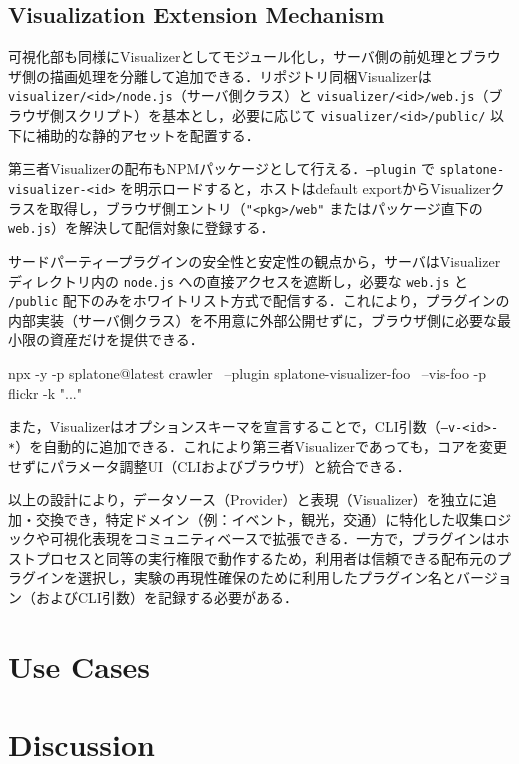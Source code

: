 \documentclass[11pt,a4paper]{jlreq}
\begin{document}
\subsection{Visualization Extension Mechanism}
\label{sec:visualizationextension}
可視化部も同様にVisualizerとしてモジュール化し，サーバ側の前処理とブラウザ側の描画処理を分離して追加できる．リポジトリ同梱Visualizerは \texttt{visualizer/<id>/node.js}（サーバ側クラス）と \texttt{visualizer/<id>/web.js}（ブラウザ側スクリプト）を基本とし，必要に応じて \texttt{visualizer/<id>/public/} 以下に補助的な静的アセットを配置する．

第三者Visualizerの配布もNPMパッケージとして行える．\texttt{--plugin} で \texttt{splatone-visualizer-<id>} を明示ロードすると，ホストはdefault exportからVisualizerクラスを取得し，ブラウザ側エントリ（\texttt{"<pkg>/web"} またはパッケージ直下の \texttt{web.js}）を解決して配信対象に登録する．

サードパーティープラグインの安全性と安定性の観点から，サーバはVisualizerディレクトリ内の \texttt{node.js} への直接アクセスを遮断し，必要な \texttt{web.js} と \texttt{/public} 配下のみをホワイトリスト方式で配信する．これにより，プラグインの内部実装（サーバ側クラス）を不用意に外部公開せずに，ブラウザ側に必要な最小限の資産だけを提供できる．

\begin{commandline}
npx -y -p splatone@latest crawler \
  --plugin splatone-visualizer-foo \
  --vis-foo -p flickr -k "..."
\end{commandline}

また，Visualizerはオプションスキーマを宣言することで，CLI引数（\texttt{--v-<id>-*}）を自動的に追加できる．これにより第三者Visualizerであっても，コアを変更せずにパラメータ調整UI（CLIおよびブラウザ）と統合できる．

以上の設計により，データソース（Provider）と表現（Visualizer）を独立に追加・交換でき，特定ドメイン（例：イベント，観光，交通）に特化した収集ロジックや可視化表現をコミュニティベースで拡張できる．一方で，プラグインはホストプロセスと同等の実行権限で動作するため，利用者は信頼できる配布元のプラグインを選択し，実験の再現性確保のために利用したプラグイン名とバージョン（およびCLI引数）を記録する必要がある．


\section{Use Cases}
\label{sec:usecases}

\section{Discussion}
\label{sec:discussion}
\end{document}

